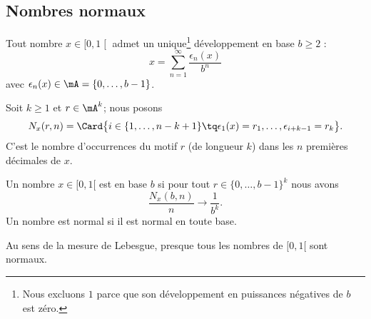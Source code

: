 \subsection{Nombres normaux}

Tout nombre \( x\in \mathopen[ 0 , 1 \mathclose[\) admet un unique\footnote{Nous excluons \( 1\) parce que son développement en puissances négatives de \( b\) est zéro.} développement en base \( b\geq 2\) :
\begin{equation}
    x=\sum_{n=1}^{\infty}\frac{ \epsilon_n(x) }{ b^n }
\end{equation}
avec \( \epsilon_n(x)\in\mA=\{ 0,\ldots, b-1 \}\).

Soit \( k\geq 1\) et \( r\in \mA^k\); nous posons
\begin{equation}
    N_x(r,n)=\Card\big\{   i\in\{ 1,\ldots, n-k+1 \}\tq \epsilon_1(x)=r_1,\ldots, \epsilon_{i+k-1}=r_k \big\}.
\end{equation}
C'est le nombre d'occurrences du motif \( r\) (de longueur \( k\)) dans les \( n\) premières décimales de \( x\).

\begin{definition}
    Un nombre \( x\in\mathopen[ 0 , 1 [\) est  en base \( b\) si pour tout \( r\in\{ 0,\ldots, b-1 \}^k\) nous avons
        \begin{equation}
            \frac{ N_x(b,n) }{ n }\to \frac{1}{ b^k }.
        \end{equation}
    Un nombre est normal si il est normal en toute base.
\end{definition}

\begin{proposition}     \label{PropEEOXLae}
    Au sens de la mesure de Lebesgue, presque tous les nombres de \( \mathopen[ 0 , 1 [\) sont normaux.    
\end{proposition}


